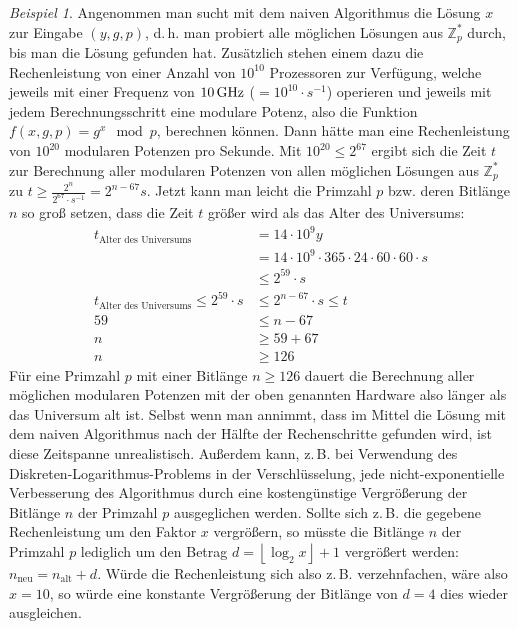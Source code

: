 \documentclass[
  a4paper,
  11pt,
]{scrartcl}
\theoremstyle{plain}
\theoremstyle{definition}
\theoremstyle{remark}
\newtheorem{beispiel}{Beispiel}
\newcommand{\Z}{\mathbb{Z}}
\begin{document}
\begin{beispiel}
  Angenommen man sucht mit dem naiven Algorithmus die Lösung $x$ zur Eingabe
  $(y, g, p)$, d.\,h. man probiert alle möglichen Lösungen aus $\Z_p^*$ durch,
  bis man die Lösung gefunden hat. Zusätzlich stehen einem dazu die
  Rechenleistung von einer Anzahl von $10^{10}$ Prozessoren zur Verfügung,
  welche jeweils mit einer Frequenz von $10 \text{\,GHz}$ ($= 10^{10} \cdot s^{-1}$)
  operieren und jeweils mit jedem Berechnungsschritt eine modulare Potenz, also
  die Funktion $f(x, g, p) = g^x \mod p$, berechnen können. Dann hätte man eine
  Rechenleistung von $10^{20}$ modularen Potenzen pro Sekunde. Mit
  $10^{20} \leq 2^{67}$ ergibt sich die Zeit $t$ zur Berechnung aller modularen
  Potenzen von allen möglichen Lösungen aus $\Z_p^*$ zu
  $t \geq \frac{2^n}{2^{67}\cdot s^{-1}}=2^{n-67} s$. Jetzt kann man leicht die
  Primzahl $p$ bzw. deren Bitlänge $n$ so groß setzen, dass die Zeit $t$ größer
  wird als das Alter des Universums:
  \begin{align*}
    t_{\text{Alter des Universums}} & = 14 \cdot 10^9 y\\
    & = 14 \cdot 10^9 \cdot 365 \cdot 24 \cdot 60\cdot 60\cdot s\\
    & \leq 2^{59}\cdot s\\
    t_{\text{Alter des Universums}} \leq 2^{59}\cdot s & \leq 2^{n-67}\cdot s \leq t\\
    59 & \leq n-67\\
    n & \geq 59+67\\
    n & \geq 126
  \end{align*}
  Für eine Primzahl $p$ mit einer Bitlänge $n \geq 126$ dauert die Berechnung
  aller möglichen modularen Potenzen mit der oben genannten Hardware also länger
  als das Universum alt ist. Selbst wenn man annimmt, dass im Mittel die Lösung
  mit dem naiven Algorithmus nach der Hälfte der Rechenschritte gefunden wird,
  ist diese Zeitspanne unrealistisch. Außerdem kann, z.\,B. bei Verwendung des
  Diskreten-Logarithmus-Problems in der Verschlüsselung, jede
  nicht-exponentielle Verbesserung des Algorithmus durch eine kostengünstige
  Vergrößerung der Bitlänge $n$ der Primzahl $p$ ausgeglichen werden. Sollte
  sich z.\,B. die gegebene Rechenleistung um den Faktor $x$ vergrößern, so
  müsste die Bitlänge $n$ der Primzahl $p$ lediglich um den Betrag
  $d = \left\lfloor \log_2 x \right\rfloor + 1$ vergrößert werden:
  $n_{\text{neu}} = n_{\text{alt}} + d$. Würde die Rechenleistung sich also
  z.\,B. verzehnfachen, wäre also $x=10$, so würde eine konstante Vergrößerung
  der Bitlänge von $d=4$ dies wieder ausgleichen.
\end{beispiel}
\end{document}
